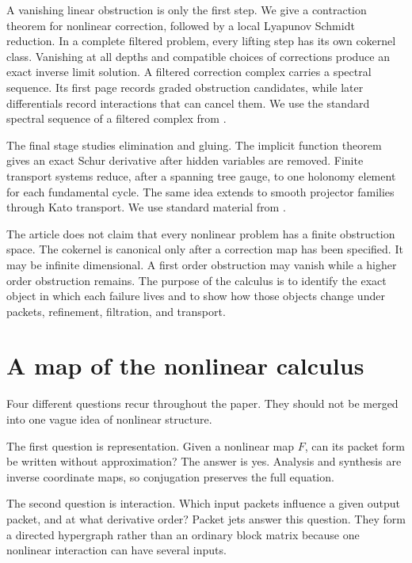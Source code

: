 \documentclass[11pt,a4paper]{article}
\theoremstyle{plain}
\theoremstyle{definition}
\theoremstyle{remark}
\begin{document}
A vanishing linear obstruction is only the first step.  We give a contraction theorem for nonlinear correction, followed by a local Lyapunov Schmidt reduction.  In a complete filtered problem, every lifting step has its own cokernel class.  Vanishing at all depths and compatible choices of corrections produce an exact inverse limit solution.  A filtered correction complex carries a spectral sequence.  Its first page records graded obstruction candidates, while later differentials record interactions that can cancel them.  We use the standard spectral sequence of a filtered complex from \cite{Weibel1994,McCleary2001}.

The final stage studies elimination and gluing.  The implicit function theorem gives an exact Schur derivative after hidden variables are removed.  Finite transport systems reduce, after a spanning tree gauge, to one holonomy element for each fundamental cycle.  The same idea extends to smooth projector families through Kato transport.  We use standard material from \cite{Deimling1985,GrossTucker1987,Kato1950,Kato1995,KobayashiNomizu1963}.

The article does not claim that every nonlinear problem has a finite obstruction space.  The cokernel is canonical only after a correction map has been specified.  It may be infinite dimensional.  A first order obstruction may vanish while a higher order obstruction remains.  The purpose of the calculus is to identify the exact object in which each failure lives and to show how those objects change under packets, refinement, filtration, and transport.


\section{A map of the nonlinear calculus}\label{sec:map}

Four different questions recur throughout the paper.  They should not be merged into one vague idea of nonlinear structure.

The first question is representation.  Given a nonlinear map $F$, can its packet form be written without approximation?  The answer is yes.  Analysis and synthesis are inverse coordinate maps, so conjugation preserves the full equation.

The second question is interaction.  Which input packets influence a given output packet, and at what derivative order?  Packet jets answer this question.  They form a directed hypergraph rather than an ordinary block matrix because one nonlinear interaction can have several inputs.
\end{document}
